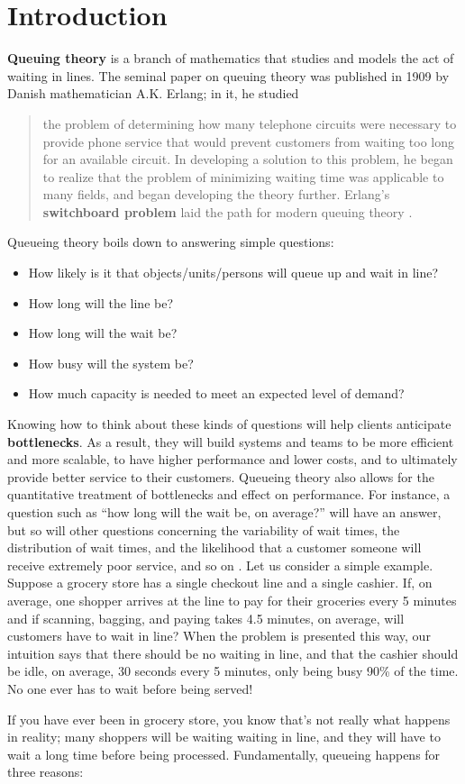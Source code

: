 \section{Introduction}\textbf{Queuing theory} is a branch of mathematics that studies and models the act of waiting in lines.  The seminal paper on queuing theory \cite{QS_Erlang} was published in 1909 by Danish mathematician A.K. Erlang; in it, he studied \begin{quote} the problem of determining how many telephone circuits were necessary to provide phone service that would prevent customers from waiting too long for an available circuit. In developing a solution to this problem, he began to realize that the problem of minimizing waiting time was applicable to many fields, and began developing the theory further. Erlang's \textbf{switchboard problem} laid the path for modern queuing theory \cite{QS_Berry}.\end{quote}
Queueing theory boils down to answering simple questions:
\begin{itemize}[noitemsep]
\item How likely is it that objects/units/persons will queue up and wait in line?
\item How long will the line be?
\item How long will the wait be?
\item How busy will the system  be?
\item How much capacity is needed to meet an expected level of demand?
\end{itemize}
Knowing how to think about these kinds of questions will help clients anticipate \textbf{bottlenecks}. As a result, they will build systems and teams to be more efficient and more scalable, to have higher performance and lower costs, and to ultimately provide better service to their customers. \newl Queueing theory also allows for the quantitative treatment of bottlenecks and effect on performance. For instance, a question such as ``how long will the wait be, on average?'' will have an answer, but so will other questions concerning the variability of wait times, the distribution of wait times, and the likelihood that a customer someone will receive extremely poor service, and so on \cite{QS_K1}.
\newl 
Let us consider a simple example. Suppose a grocery store has a single checkout line and a single cashier. If, on average, one shopper arrives at the line to pay for their groceries every 5 minutes and if scanning, bagging, and paying takes 4.5 minutes, on average, will customers have to wait in line? When the problem is presented this way, our intuition says that there should be no waiting in line, and that the cashier should be idle, on average, 30 seconds every 5 minutes, only being busy 90\% of the time. No one ever has to wait before being served! \par If you have ever been in grocery store, you know that's not really what happens in reality; many shoppers will be waiting waiting in line, and they will have to wait a long time before being processed. Fundamentally, queueing happens for three reasons:

